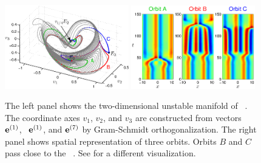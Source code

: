 \begin{figure}[h]
\begin{center}
\includegraphics[width=0.48\textwidth]{figs/ks22_E2_manifold_c.eps}%
\includegraphics[width=0.48\textwidth]{figs/ks22_E2_orbits_c.eps}
\end{center}
\caption{
The left panel shows the two-dimensional
unstable manifold of \eqv\ . The coordinate axes
$v_1$, $v_2$, and $v_3$ are constructed from vectors
\Re\, ${\mathbf e}^{(1)}$, \Im\, ${\mathbf e}^{(1)}$, and ${\mathbf e}^{(7)}$
by Gram-Schmidt orthogonalization.
The right panel shows spatial representation of three orbits. Orbits
$B$ and $C$ pass close to the \eqv\ . See
 for a different visualization.
       }
\label{f:KS22E2man}
\end{figure}


